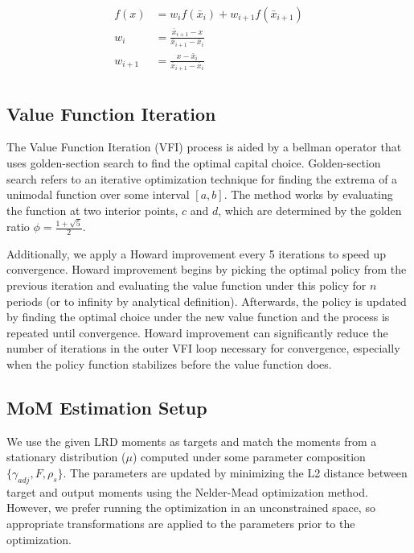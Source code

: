 \begin{equation}
    \begin{aligned}
        f(x) &= w_i f(\bar{x}_i) + w_{i+1} f(\bar{x}_{i+1}) \\
        w_i &= \frac{\bar{x}_{i+1} - x}{\bar{x}_{i+1} - \bar{x}_i} \\
        w_{i+1} &= \frac{x - \bar{x}_i}{\bar{x}_{i+1} - \bar{x}_i} \\
    \end{aligned}
\end{equation}


\subsection{Value Function Iteration}\label{subsec:vfi}
The Value Function Iteration (VFI) process is aided by a bellman operator that uses golden-section search to find the optimal capital choice.
Golden-section search refers to an iterative optimization technique for finding the extrema of a unimodal function over some interval $[a, b]$.
The method works by evaluating the function at two interior points, $c$ and $d$, which are determined by the golden ratio $\phi = \frac{1 + \sqrt{5}}{2}$.

\vspace{\baselineskip}

Additionally, we apply a Howard improvement every 5 iterations to speed up convergence.
Howard improvement begins by picking the optimal policy from the previous iteration and evaluating the value function under this policy for $n$ periods (or to infinity by analytical definition).
Afterwards, the policy is updated by finding the optimal choice under the new value function and the process is repeated until convergence.
Howard improvement can significantly reduce the number of iterations in the outer VFI loop necessary for convergence, especially when the policy function stabilizes before the value function does.

\subsection{MoM Estimation Setup}\label{subsec:smm_setup}
We use the given LRD moments as targets and match the moments from a stationary distribution ($\mu$) computed under some parameter composition $\{\gamma_{adj}, F, \rho_s\}$.
The parameters are updated by minimizing the L2 distance between target and output moments using the Nelder-Mead optimization method. 
However, we prefer running the optimization in an unconstrained space, so appropriate transformations are applied to the parameters prior to the optimization.

